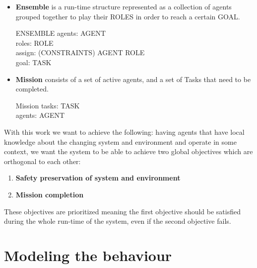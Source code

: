 \documentclass[journal]{IEEEtran}
\theoremstyle{definition}
\begin{document}
\begin{itemize}
A task contains specific CONSTRAINTS that should be satisfied for successful execution. The constraints are usually information about what the ensemble(group of robots executing the TASK) should satisfy and this is directly related to the TASK input.
\begin{schema}{TASK}
T: \power BEHAVIOUR \\
INPUT: \power DATA  \\
CSTR: \power CONSTRAINT \\
PLAN: BEHAVIOUR \fun BEHAVIOUR
\end{schema}
\item \textbf{Ensemble} is a run-time structure represented as a collection of agents grouped together to play their ROLES in order to reach a certain GOAL. 
\begin{schema}{ENSEMBLE}
agents: \power AGENT \\
roles: \power ROLE  \\
assign: (CONSTRAINTS) AGENT \rel ROLE \\
goal: TASK 
\end{schema}

\item \textbf{Mission} consists of a set of active agents, and a set of Tasks that need to be completed.
\begin{schema}{Mission}
tasks: \power TASK \\
agents: \power AGENT
\end{schema}
\end{itemize}

  With this work we want to achieve the following:
having agents that have local knowledge about the changing system and environment and operate in some context, 
we want the system to be able to achieve two global objectives which are orthogonal to each other: 
\begin{enumerate}
\item \textbf{Safety preservation of system and environment} 
\item \textbf{Mission completion} 
\end{enumerate}
These objectives are prioritized meaning the first objective should be satisfied during the whole run-time of the system, even if the second objective fails.

\section{Modeling the behaviour}
\end{document}
